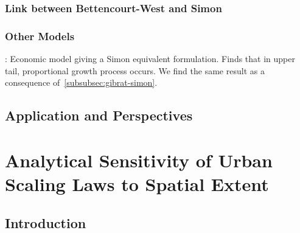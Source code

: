 \subsubsection{Link between Bettencourt-West and Simon}

\cite{bettencourt2008large}


\subsubsection{Other Models}

\cite{gabaix1999zipf} : Economic model giving a Simon equivalent formulation. Finds that in upper tail, proportional growth process occurs. We find the same result as a consequence of~\ref{subsubsec:gibrat-simon}.




\subsection{Application and Perspectives}














\newpage




\section{Analytical Sensitivity of Urban Scaling Laws to Spatial Extent}



\subsection{Introduction}



